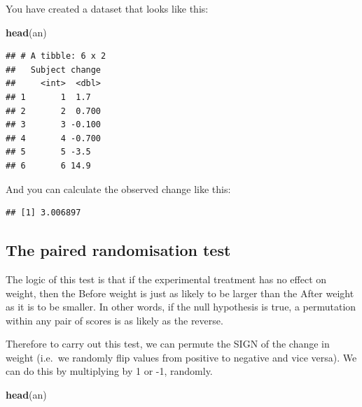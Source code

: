 \documentclass[
  a4paperpaper,
]{book}
\newenvironment{Shaded}{\begin{snugshade}}{\end{snugshade}}
\newcommand{\KeywordTok}[1]{\textcolor[rgb]{0.13,0.29,0.53}{\textbf{#1}}}
\newcommand{\NormalTok}[1]{#1}
\newcommand{\OperatorTok}[1]{\textcolor[rgb]{0.81,0.36,0.00}{\textbf{#1}}}
\newcommand{\StringTok}[1]{\textcolor[rgb]{0.31,0.60,0.02}{#1}}
\begin{document}
You have created a dataset that looks like this:

\begin{Shaded}
\begin{Highlighting}[]
\KeywordTok{head}\NormalTok{(an)}
\end{Highlighting}
\end{Shaded}

\begin{verbatim}
## # A tibble: 6 x 2
##   Subject change
##     <int>  <dbl>
## 1       1  1.7  
## 2       2  0.700
## 3       3 -0.100
## 4       4 -0.700
## 5       5 -3.5  
## 6       6 14.9
\end{verbatim}

And you can calculate the observed change like this:

\begin{Shaded}
\end{Shaded}

\begin{verbatim}
## [1] 3.006897
\end{verbatim}

\hypertarget{the-paired-randomisation-test}{%
\subsection{The paired randomisation test}\label{the-paired-randomisation-test}}

The logic of this test is that if the experimental treatment has no effect on weight, then the Before weight is just as likely to be larger than the After weight as it is to be smaller.
In other words, if the null hypothesis is true, a permutation within any pair of scores is as likely as the reverse.

Therefore to carry out this test, we can permute the SIGN of the change in weight (i.e.~we randomly flip values from positive to negative and vice versa). We can do this by multiplying by 1 or -1, randomly.

\begin{Shaded}
\begin{Highlighting}[]
\KeywordTok{head}\NormalTok{(an)}
\end{Highlighting}
\end{Shaded}
\end{document}
